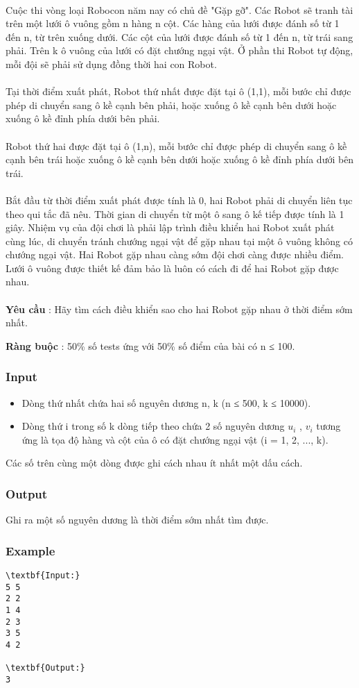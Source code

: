 

 

Cuộc thi vòng loại Robocon năm nay có chủ đề "Gặp gỡ". Các Robot sẽ tranh tài trên một lưới ô vuông gồm n hàng n cột. Các hàng của lưới được đánh số từ 1 đến n, từ trên xuống dưới. Các cột của lưới được đánh số từ 1 đến n, từ trái sang phải. Trên k ô vuông của lưới có đặt chướng ngại vật. Ở phần thi Robot tự động, mỗi đội sẽ phải sử dụng đồng thời hai con Robot.
\\
\\Tại thời điểm xuất phát, Robot thứ nhất được đặt tại ô (1,1), mỗi bước chỉ được phép di chuyển sang ô kề cạnh bên phải, hoặc xuống ô kề cạnh bên dưới hoặc xuống ô kề đỉnh phía dưới bên phải.
\\
\\Robot thứ hai được đặt tại ô (1,n), mỗi bước chỉ được phép di chuyển sang ô kề cạnh bên trái hoặc xuống ô kề cạnh bên dưới hoặc xuống ô kề đỉnh phía dưới bên trái.
\\
\\Bắt đầu từ thời điểm xuất phát được tính là 0, hai Robot phải di chuyển liên tục theo qui tắc đã nêu. Thời gian di chuyển từ một ô sang ô kế tiếp được tính là 1 giây. Nhiệm vụ của đội chơi là phải lập trình điều khiển hai Robot xuất phát cùng lúc, di chuyển tránh chướng ngại vật để gặp nhau tại một ô vuông không có chướng ngại vật. Hai Robot gặp nhau càng sớm đội chơi càng được nhiều điểm. Lưới ô vuông được thiết kế đảm bảo là luôn có cách đi để hai Robot gặp được nhau.
\\
\\\textbf{Yêu cầu } : Hãy tìm cách điều khiển sao cho hai Robot gặp nhau ở thời điểm sớm nhất.

\textbf{Ràng buộc } : 50\% số tests ứng với 50\% số điểm của bài có n ≤ 100.

\subsubsection{Input}
\begin{itemize}
	\item Dòng thứ nhất chứa hai số nguyên dương n, k (n ≤ 500, k ≤ 10000).
	\item Dòng thứ i trong số k dòng tiếp theo chứa 2 số nguyên dương $u_{i}$ , $v_{i}$ tương ứng là tọa độ hàng và cột của ô có đặt chướng ngại vật (i = 1, 2, ..., k).
\end{itemize}

Các số trên cùng một dòng được ghi cách nhau ít nhất một dấu cách.

\subsubsection{Output}

Ghi ra một số nguyên dương là thời điểm sớm nhất tìm được.

\subsubsection{Example}
\begin{verbatim}
\textbf{Input:}
5 5
2 2
1 4
2 3
3 5
4 2

\textbf{Output:}
3
\end{verbatim}
